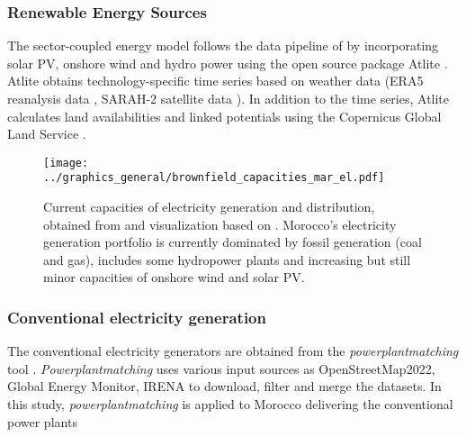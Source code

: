 


\subsubsection*{Renewable Energy Sources}
The sector-coupled energy model follows the data pipeline of \cite{Parzen2023} by incorporating solar PV, onshore wind and hydro power using the open source package Atlite \cite{Hofmann2021}. %
Atlite obtains technology-specific time series based on weather data (ERA5 reanalysis data \cite{Hersbach2020}, SARAH-2 satellite data \cite{Pfeifroth2017}). %
In addition to the time series, Atlite calculates land availabilities and linked potentials using the Copernicus Global Land Service \cite{Buchhorn2020}.





\begin{figure*}[t]
    \centering
    \texttt{[image: ../graphics\_general/brownfield\_capacities\_mar\_el.pdf]}
    \caption{Current capacities of electricity generation and distribution, obtained from \cite{Parzen2022} and visualization based on \cite{Horsch2018}. Morocco's electricity generation portfolio is currently dominated by fossil generation (coal and gas), includes some hydropower plants and increasing but still minor capacities of onshore wind and solar PV.}
    \label{fig:MAR_brownfield}
\end{figure*}


\subsubsection*{Conventional electricity generation}
The conventional electricity generators are obtained from the \textit{powerplantmatching} tool \cite{Powerplantmatching2019}. \textit{Powerplantmatching} uses various input sources as OpenStreetMap2022, Global Energy Monitor, IRENA \cite{IRENA2022, OpenStreetMap2022, GlobalEnergyMonitor} to download, filter and merge the datasets. 
In this study, \textit{powerplantmatching} is applied to Morocco delivering the conventional power plants%


